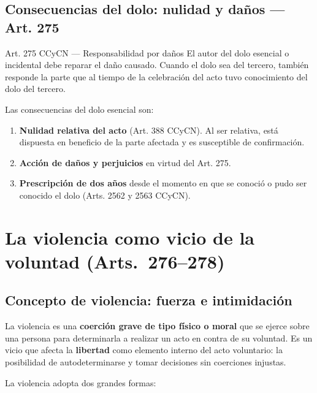\documentclass[12pt,oneside]{book}
\begin{document}
\section{Consecuencias del dolo: nulidad y daños --- Art. 275}

\begin{articulo}{Art. 275 CCyCN --- Responsabilidad por daños}
El autor del dolo esencial o incidental debe reparar el daño causado. Cuando el dolo sea del tercero, también responde la parte que al tiempo de la celebración del acto tuvo conocimiento del dolo del tercero.
\end{articulo}

Las consecuencias del dolo esencial son:

\begin{enumerate}
    \item \textbf{Nulidad relativa del acto} (Art. 388 CCyCN). Al ser relativa, está dispuesta en beneficio de la parte afectada y es susceptible de confirmación.
    \item \textbf{Acción de daños y perjuicios} en virtud del Art. 275.
    \item \textbf{Prescripción de dos años} desde el momento en que se conoció o pudo ser conocido el dolo (Arts. 2562 y 2563 CCyCN).
\end{enumerate}

\chapter{La violencia como vicio de la voluntad (Arts.~276--278)}

\section{Concepto de violencia: fuerza e intimidación}

La violencia es una \textbf{coerción grave de tipo físico o moral} que se ejerce sobre una persona para determinarla a realizar un acto en contra de su voluntad. Es un vicio que afecta la \textbf{libertad} como elemento interno del acto voluntario: la posibilidad de autodeterminarse y tomar decisiones sin coerciones injustas.

La violencia adopta dos grandes formas:
\end{document}
